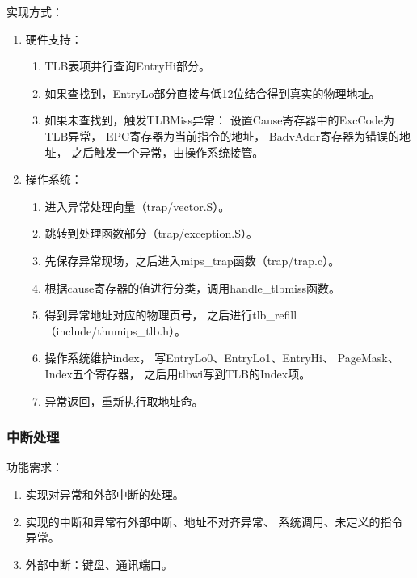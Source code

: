             实现方式：
            \begin{enumerate}
            \item
                硬件支持：
                \begin{enumerate}
                \item
                TLB表项并行查询EntryHi部分。
                \item
                如果查找到，EntryLo部分直接与低12位结合得到真实的物理地址。
                \item
                如果未查找到，触发TLBMiss异常：%
                设置Cause寄存器中的ExcCode为TLB异常，%
                EPC寄存器为当前指令的地址，%
                BadvAddr寄存器为错误的地址，%
                之后触发一个异常，由操作系统接管。
                \end{enumerate}
            \item
                操作系统：
                \begin{enumerate}
                \item
                进入异常处理向量（trap/vector.S）。
                \item
                跳转到处理函数部分（trap/exception.S）。
                \item
                先保存异常现场，之后进入mips\_trap函数（trap/trap.c）。
                \item
                根据cause寄存器的值进行分类，调用handle\_tlbmiss函数。
                \item
                得到异常地址对应的物理页号，%
                之后进行tlb\_refill（include/thumips\_tlb.h）。
                \item
                操作系统维护index，%
                写EntryLo0、EntryLo1、EntryHi、 PageMask、Index五个寄存器，%
                之后用tlbwi写到TLB的Index项。
                \item
                异常返回，重新执行取地址命。%
                \end{enumerate}
            \end{enumerate}
        \subsubsection{中断处理}
            功能需求：
            \begin{enumerate}
            \item
            实现对异常和外部中断的处理。
            \item
            实现的中断和异常有外部中断、地址不对齐异常、%
            系统调用、未定义的指令异常。
            \item
            外部中断：键盘、通讯端口。
            \end{enumerate}

